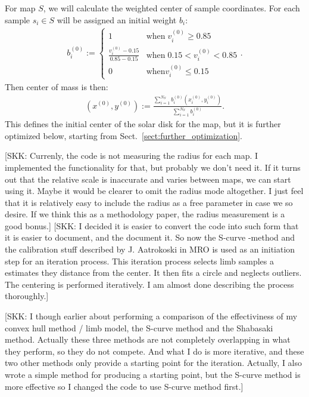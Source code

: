 \documentclass{aa}
\newcommand{\skk}[1]{\textcolor{midorange}{[SKK: #1]}} %
\newcommand{\eqnl}[2]{\begin{eqnarray}\label{#1}#2\end{eqnarray}}
\begin{document}
  For map $S$, we will calculate the weighted center of sample coordinates. For each sample $s_i \in S$ will be assigned an initial weight $b_i$:
  \eqnl{centering-initial-weight}{
  b_i^{(0)} := \begin{cases} 1 & \text{when}\; v_i^{(0)} \ge 0.85 \\ \frac{v_i^{(0)} - 0.15}{0.85 - 0.15} & \text{when}\; 0.15 < v_i^{(0)} < 0.85 \\ 0 & \text{when} v_i^{(0)} \le 0.15 \end{cases} \text{.}
  }
  Then center of mass is then:
  \eqnl{centering-center-of-mass}{
  \left( x^{(0)}, y^{(0)} \right) := \frac{\sum \limits_{i=1}^{N_S} b_i^{(0)} \left( x_i^{(0)}, y_i^{(0)} \right)}{\sum \limits_{i=1}^{N_S} b_i^{(0)}} \text{.}
  }
  This defines the initial center of the solar disk for the map, but it is further optimized below, starting from Sect.~\ref{sect:further_optimization}.

  \skk{Currenly, the code is not measuring the radius for each map. I implemented the functionality for 
  that, but probably we don't need it. If it turns out that the relative scale is inaccurate and varies between maps, we 
  can start using it. Maybe it would be clearer to omit the radius mode altogether. I just feel that it is relatively 
  easy to include the radius as a free parameter in case we so desire. If we think this as a methodology paper, the 
  radius measurement is a good bonus.}  
    \skk{I decided it is easier to convert the code into such form that it is easier to document, and the document it. 
    So now the S-curve -method and the calibration stuff described by J. Aatrokoski in MRO is used as an initiation step 
    for an iteration process. This iteration process selects limb samples a estimates they distance from the center. It 
    then fits a circle and neglects outliers. The centering is performed iteratively. I am almost done describing the 
    process thoroughly.}

    \skk{I though earlier about performing a comparison of the effectiviness of my convex hull method / limb model, the 
    S-curve method and the Shabasaki method. Actually these three methods are not completely overlapping in what they 
    perform, so they do not compete. And what I do is more iterative, and these two other methods only provide a 
    starting point for the iteration. Actually, I also wrote a simple method for producing a starting point, but the 
    S-curve method is more effective so I changed the code to use S-curve method first.}
\end{document}
